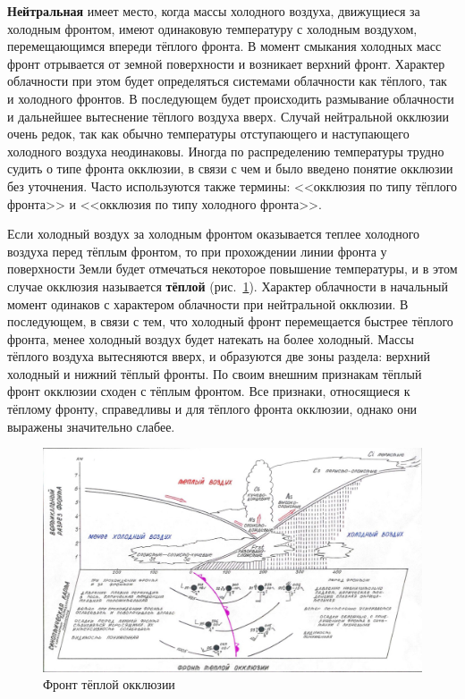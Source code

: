 \documentclass[a4paper, 12pt, twoside, draft, book, russian, fittopage, cyremdash, openright]{ncc}
\begin{document}
\textbf{Нейтральная} имеет место,
когда массы холодного воздуха, движущиеся за холодным фронтом, имеют
одинаковую температуру с холодным воздухом, перемещающимся впереди
тёплого фронта. В момент смыкания холодных масс фронт отрывается от
земной поверхности и возникает верхний фронт. Характер облачности при
этом будет определяться системами облачности как тёплого, так и
холодного фронтов. В последующем будет происходить размывание
облачности и дальнейшее вытеснение тёплого воздуха вверх. Случай
нейтральной окклюзии очень редок, так как обычно температуры
отступающего и наступающего холодного воздуха неодинаковы. Иногда по
распределению температуры трудно судить о типе фронта окклюзии, в
связи с чем и было введено понятие окклюзии без уточнения. Часто
используются также термины: <<окклюзия по типу тёплого фронта>> и
<<окклюзия по типу холодного фронта>>.

Если холодный воздух за холодным фронтом оказывается теплее холодного
воздуха перед тёплым фронтом, то при прохождении линии фронта у
поверхности Земли будет отмечаться некоторое повышение температуры, и
в этом случае окклюзия называется \textbf{тёплой}
(рис.~\ref{fig:10_warm_ocl_front}). Характер облачности в начальный
момент одинаков с характером облачности при нейтральной окклюзии. В
последующем, в связи с тем, что холодный фронт перемещается быстрее
тёплого фронта, менее холодный воздух будет натекать на более
холодный. Массы тёплого воздуха вытесняются вверх, и образуются две
зоны раздела: верхний холодный и нижний тёплый фронты. По своим
внешним признакам тёплый фронт окклюзии сходен с тёплым фронтом. Все
признаки, относящиеся к тёплому фронту, справедливы и для тёплого
фронта окклюзии, однако они выражены значительно слабее.

\begin{figure}[htb]
   \centering
   \includegraphics[scale=0.7]{10_warm_ocl_front.pdf}
   \caption{Фронт тёплой окклюзии}
   \label{fig:10_warm_ocl_front}
\end{figure}
\end{document}
